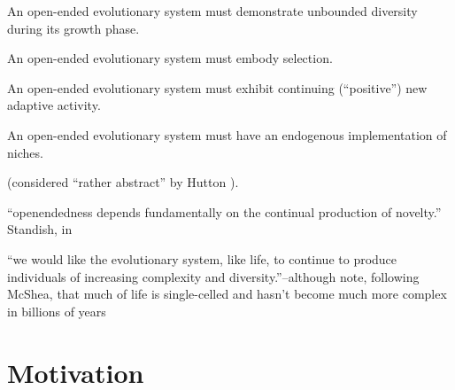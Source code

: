 \begin{NOTES}
\begin{compactitem}
	\item An open-ended evolutionary system must demonstrate unbounded diversity during its growth phase.
	\item An open-ended evolutionary system must embody selection.
	\item An open-ended evolutionary system must exhibit continuing (``positive'') new adaptive activity.
	\item An open-ended evolutionary system must have an endogenous implementation of niches.
\end{compactitem} \cite{Maley1999} (considered ``rather abstract'' by Hutton \parencite[p.341]{Hutton2002}).

``openendedness depends fundamentally on the continual production of novelty.'' Standish, in \parencite{Soros2014}

``we would like the evolutionary system, like life, to continue to produce individuals of increasing complexity and diversity.''--although note, following McShea, that much of life is single-celled and hasn't become much more complex in billions of years \parencite{Maley1999}

\end{NOTES}

\section{Motivation}\label{motivation}

